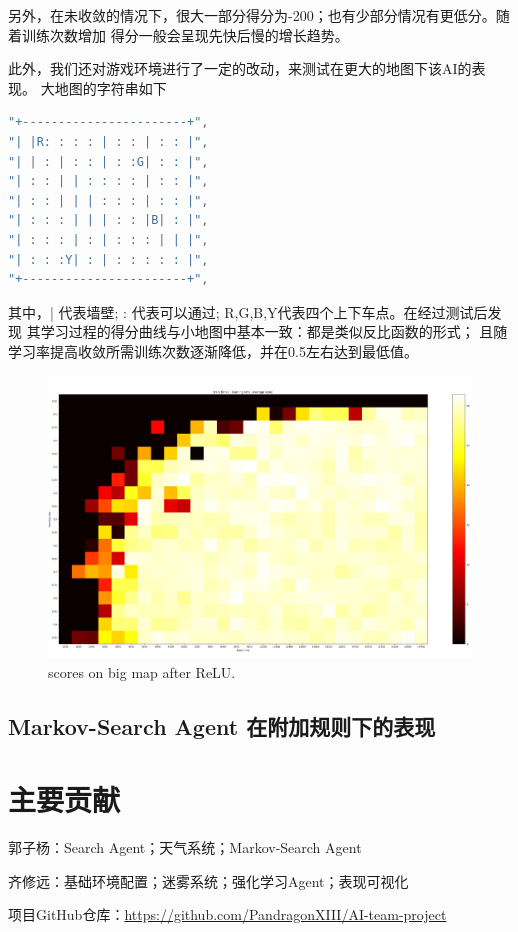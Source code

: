 \documentclass{article}
\begin{document}
\begin{CJK}{UTF8}{gbsn}
另外，在未收敛的情况下，很大一部分得分为-200；也有少部分情况有更低分。随着训练次数增加
得分一般会呈现先快后慢的增长趋势。 

此外，我们还对游戏环境进行了一定的改动，来测试在更大的地图下该AI的表现。
大地图的字符串如下
\begin{lstlisting}[language = C]
"+-----------------------+",
"| |R: : : : | : : | : : |",
"| | : | : : | : :G| : : |",
"| : : | | : : : : | : : |",
"| : : | | | : : : | : : |",
"| : : : | | | : : |B| : |",
"| : : : | : | : : : | | |",
"| : : :Y| : | : : : : : |",
"+-----------------------+",
\end{lstlisting}
其中，| 代表墙壁; : 代表可以通过; R,G,B,Y代表四个上下车点。在经过测试后发现
其学习过程的得分曲线与小地图中基本一致：都是类似反比函数的形式；
且随学习率提高收敛所需训练次数逐渐降低，并在0.5左右达到最低值。
\begin{figure}[htbp]
  \centering
  \includegraphics[scale = 0.2]{images/big_map_relu.png}
  \caption{scores on big map after ReLU.}
\end{figure} 


\subsection{Markov-Search Agent 在附加规则下的表现}

\section{主要贡献}
郭子杨：Search Agent；天气系统；Markov-Search Agent 

齐修远：基础环境配置；迷雾系统；强化学习Agent；表现可视化 


项目GitHub仓库：\url{https://github.com/PandragonXIII/AI-team-project} 


\end{CJK}
\end{document}
